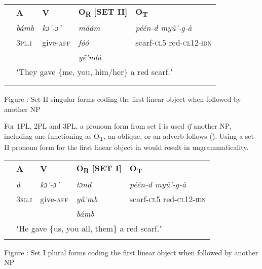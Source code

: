 \documentclass[output=paper]{langsci/langscibook}
\begin{document}
{{\begin{tabular}{lllll} & \textbf{A} & \textbf{V} & \textbf{O}\textbf{\textsubscript{R}}\textbf{ [SET II]} & \textbf{O}\textbf{\textsubscript{T}}\\
\lsptoprule
& \textit{b\'{a}mb} & \textit{kɔ\'{ }-ɔ\`{ }} & \textit{m\'{a}\'{a}m} & \textit{p\'{e}\'{e}n-d      my\~{u}\'{ }-g-\`{a}}\\
& 3\textsc{pl.i} & give-\textsc{aff} & \textit{f\'{o}\'{o}} & scarf-\textsc{cl5 } red-\textsc{cl12-idn}\\
&  &  & \textit{y\~{e}\'{ }nd\`{a}} & \\
& \multicolumn{4}{l}{ʻThey gave \{me, you, him/her\} a red scarf.ʼ}\\
& \multicolumn{4}{l}{}\\
\lspbottomrule
\end{tabular}
\begin{styleTabellenberschrift}
Figure : Set II singular forms coding the first linear object when followed by another NP
\end{styleTabellenberschrift}

For 1PL, 2PL and 3PL, a pronoun form from set I is used \textit{if} another NP, including one functioning as O\textsubscript{T}, an oblique, or an adverb follows (). Using a set II pronoun form for the first linear object in  would result in ungrammaticality.

\begin{tabular}{lllll} & \textbf{A} & \textbf{V} & \textbf{O}\textbf{\textsubscript{R}}\textbf{ [SET I]} & \textbf{O}\textbf{\textsubscript{T}}\textbf{ }\\
\lsptoprule
& \textit{\`{a}} & \textit{kɔ\'{ }-ɔ\`{ }} & \textit{tɔnd} & \textit{p\'{e}\'{e}n-d         my\~{u}\'{ }-g-\`{a}}\\
& 3\textsc{sg.i} & give-\textsc{aff} & \textit{y\~{a}\'{ }mb} & scarf-\textsc{cl5}    red-\textsc{cl12-idn}\\
&  &  & \textit{b\'{a}mb} & \\
& \multicolumn{4}{l}{ʻHe gave \{us, you all, them\} a red scarf.ʼ

}\\
\lspbottomrule
\end{tabular}
\begin{styleTabellenberschrift}
\label{bkm:Ref424143970}Figure : Set I plural forms coding the first linear object when followed by another NP
\end{styleTabellenberschrift}

}}
\end{document}
